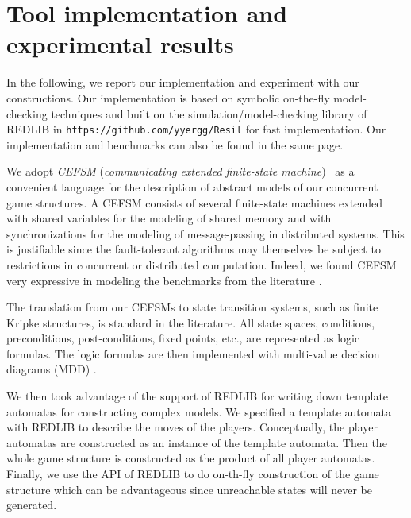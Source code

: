 \section{Tool implementation and experimental results}
In the following, we report our implementation and experiment 
with our constructions.  
Our implementation is based on symbolic on-the-fly 
model-checking techniques 
and built on the simulation/model-checking library of REDLIB in 
\verb+https://github.com/yyergg/Resil+ for fast implementation.  
Our implementation and benchmarks can also be found in the same page. 

We adopt {\em CEFSM} 
({\em communicating extended finite-state machine})~\cite{BH89} 
as a convenient language for the description of abstract models of 
our concurrent game structures. 
A CEFSM consists of several finite-state machines extended with shared variables 
for the modeling of shared memory and 
with synchronizations for 
the modeling of message-passing in distributed systems.  
This is justifiable 
since the fault-tolerant algorithms may themselves be subject to  
restrictions in concurrent or distributed computation.  
Indeed, we found CEFSM very expressive in modeling the 
benchmarks from the literature \cite{CL99,RSB90}.  
\smallskip



The translation from our CEFSMs to state transition systems, 
such as finite Kripke structures, is standard in the literature. 
All state spaces, conditions, preconditions, post-conditions, 
fixed points, etc., are represented as logic formulas. 
The logic formulas are then implemented with multi-value decision diagrams 
(MDD) \cite{MD98}.  

\label{reply1.due.to.huge}
We then took advantage of the support of REDLIB for writing down 
template automatas for constructing complex models. 
We specified a template automata with REDLIB to describe the moves of the players. 
Conceptually, the player automatas are constructed as an instance of the template automata. 
Then the whole game structure is constructed as the product of all player automatas. 
Finally, we use the API of REDLIB to do on-th-fly construction of the game structure which 
can be advantageous since unreachable states will never be generated.  
